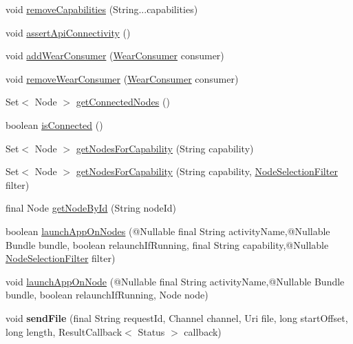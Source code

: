 \begin{DoxyCompactItemize}
void \hyperlink{classcom_1_1google_1_1devrel_1_1wcl_1_1WearManager_a2b109af6823821ac6a98a5647e45a999}{remove\+Capabilities} (String...\+capabilities)
\item 
void \hyperlink{classcom_1_1google_1_1devrel_1_1wcl_1_1WearManager_a36a36044ee9bf8270a9d9d76fc97a22f}{assert\+Api\+Connectivity} ()
\item 
void \hyperlink{classcom_1_1google_1_1devrel_1_1wcl_1_1WearManager_ab1ead896194d81adf7750d73e146d7d4}{add\+Wear\+Consumer} (\hyperlink{interfacecom_1_1google_1_1devrel_1_1wcl_1_1callbacks_1_1WearConsumer}{Wear\+Consumer} consumer)
\item 
void \hyperlink{classcom_1_1google_1_1devrel_1_1wcl_1_1WearManager_a473eca98cfa817fb734f7342bc045ce1}{remove\+Wear\+Consumer} (\hyperlink{interfacecom_1_1google_1_1devrel_1_1wcl_1_1callbacks_1_1WearConsumer}{Wear\+Consumer} consumer)
\item 
Set$<$ Node $>$ \hyperlink{classcom_1_1google_1_1devrel_1_1wcl_1_1WearManager_a06adaa67e5280cd12bd2374cab0b0921}{get\+Connected\+Nodes} ()
\item 
boolean \hyperlink{classcom_1_1google_1_1devrel_1_1wcl_1_1WearManager_a2cf9fd5b78f9c298da3b3623c4d7b949}{is\+Connected} ()
\item 
Set$<$ Node $>$ \hyperlink{classcom_1_1google_1_1devrel_1_1wcl_1_1WearManager_a60e1b28b1bb6dab27fef4e8f212c41e4}{get\+Nodes\+For\+Capability} (String capability)
\item 
Set$<$ Node $>$ \hyperlink{classcom_1_1google_1_1devrel_1_1wcl_1_1WearManager_aad690abbc750b053c44da1a1fb5bcf3c}{get\+Nodes\+For\+Capability} (String capability, \hyperlink{interfacecom_1_1google_1_1devrel_1_1wcl_1_1filters_1_1NodeSelectionFilter}{Node\+Selection\+Filter} filter)
\item 
final Node \hyperlink{classcom_1_1google_1_1devrel_1_1wcl_1_1WearManager_ac63cd9f17dd837a1ea3a65ef4a37b138}{get\+Node\+By\+Id} (String node\+Id)
\item 
boolean \hyperlink{classcom_1_1google_1_1devrel_1_1wcl_1_1WearManager_a4882d628e1f27c1529776ece9a1e1c91}{launch\+App\+On\+Nodes} (@Nullable final String activity\+Name,@Nullable Bundle bundle, boolean relaunch\+If\+Running, final String capability,@Nullable \hyperlink{interfacecom_1_1google_1_1devrel_1_1wcl_1_1filters_1_1NodeSelectionFilter}{Node\+Selection\+Filter} filter)
\item 
void \hyperlink{classcom_1_1google_1_1devrel_1_1wcl_1_1WearManager_ab281c3306888c68d304861fa199e1cb1}{launch\+App\+On\+Node} (@Nullable final String activity\+Name,@Nullable Bundle bundle, boolean relaunch\+If\+Running, Node node)
\item 
void {\bfseries send\+File} (final String request\+Id, Channel channel, Uri file, long start\+Offset, long length, Result\+Callback$<$ Status $>$ callback)\hypertarget{classcom_1_1google_1_1devrel_1_1wcl_1_1WearManager_af5f3b7329747f29380bd90a5080c1e4d}{}\label{classcom_1_1google_1_1devrel_1_1wcl_1_1WearManager_af5f3b7329747f29380bd90a5080c1e4d}


\end{DoxyCompactItemize}
